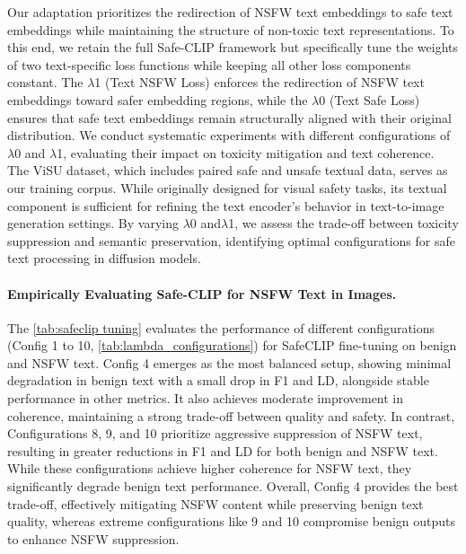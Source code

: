 Our adaptation prioritizes the redirection of NSFW text embeddings to safe text embeddings while maintaining the structure of non-toxic text representations. To this end, we retain the full Safe-CLIP framework but specifically tune the weights of two text-specific loss functions while keeping all other loss components constant. The $\lambda$1 (Text NSFW Loss) enforces the redirection of NSFW text embeddings toward safer embedding regions, while the $\lambda$0 (Text Safe Loss) ensures that safe text embeddings remain structurally aligned with their original distribution. We conduct systematic experiments with different configurations of $\lambda$0 and $\lambda$1, evaluating their impact on toxicity mitigation and text coherence. The ViSU dataset, which includes paired safe and unsafe textual data, serves as our training corpus. While originally designed for visual safety tasks, its textual component is sufficient for refining the text encoder’s behavior in text-to-image generation settings. By varying $\lambda$0 and$\lambda$1, we assess the trade-off between toxicity suppression and semantic preservation, identifying optimal configurations for safe text processing in diffusion models.

\paragraph{Empirically Evaluating Safe-CLIP for NSFW Text in Images.}

The \cref{tab:safeclip tuning} evaluates the performance of different configurations (Config 1 to 10, \cref{tab:lambda_configurations}) for SafeCLIP fine-tuning on benign and NSFW text. Config 4 emerges as the most balanced setup, showing minimal degradation in benign text with a small drop in F1 and LD, alongside stable performance in other metrics. It also achieves moderate improvement in coherence, maintaining a strong trade-off between quality and safety. In contrast, Configurations 8, 9, and 10 prioritize aggressive suppression of NSFW text, resulting in greater reductions in F1 and LD for both benign and NSFW text. While these configurations achieve higher coherence for NSFW text, they significantly degrade benign text performance. Overall, Config 4 provides the best trade-off, effectively mitigating NSFW content while preserving benign text quality, whereas extreme configurations like 9 and 10 compromise benign outputs to enhance NSFW suppression.

